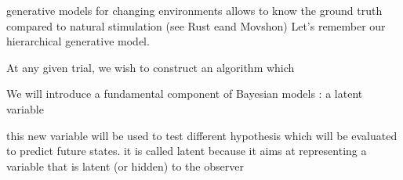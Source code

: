\documentclass[12pt,english]{article}%
\newcommand{\citep}[1]{\parencite{#1}}
\newcommand{\citet}[1]{\textcite{#1}}
\begin{document}
\label{sec:outro}

%
%

generative models for changing environments allows to know the ground truth compared to natural stimulation (see Rust eand Movshon)%
Let's remember our hierarchical generative model.

At any given trial, we wish to construct an algorithm which

We will introduce a fundamental component of Bayesian models : a latent variable

this new variable will be used to test different hypothesis which will be evaluated to predict future states. it is called latent because it aims at representing a variable that is latent (or hidden) to the observer
\end{document}
